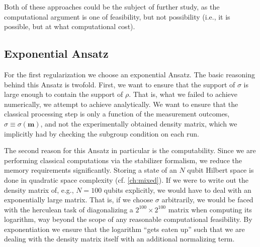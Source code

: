 Both of these approaches could be
the subject of further study, as the computational argument is one of
feasibility, but not possibility (i.e., it is possible, but at what
computational cost).

\subsection{Exponential Ansatz}
For the first regularization we choose an exponential Ansatz. The basic reasoning
behind this Ansatz is twofold. First, we want to ensure that the support of
$\sigma$ is large enough to contain the support of $\rho$. That is, what we
failed to achieve numerically, we attempt to achieve analytically. We want to
ensure that the classical processing step is only a function of the
measurement outcomes, $\sigma \equiv \sigma(\mathbf{m})$, and not the
experimentally obtained density matrix, which we implicitly had by checking the
subgroup condition on each run.

The second reason for this Ansatz in particular is the computability. Since we
are performing classical computations via the stabilizer formalism, we reduce
the memory requirements significantly. Storing a state of an $N$ qubit Hilbert
space is done in quadratic space complexity (cf. \cref{ch:mixed}). If we were
to write out the density matrix of, e.g., $N=100$ qubits explicitly, we would
have to deal with an exponentially large matrix. That is, if we choose $\sigma$
arbitrarily, 
we would be faced with the herculean task of diagonalizing a $2^{100} \times
2^{100}$ matrix when computing its logarithm, way beyond the scope of any reasonable computational
feasibility. By exponentiation we ensure that the logarithm \enquote{gets eaten
up} such that we are dealing with the density matrix itself with an additional
normalizing term.

